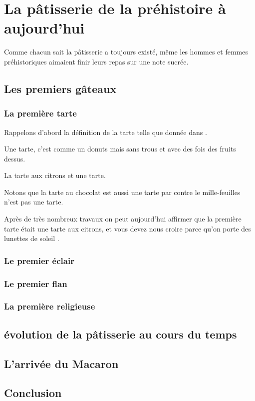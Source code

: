
\section{La pâtisserie de la préhistoire à aujourd'hui}

Comme chacun sait la pâtisserie a toujours existé, même les hommes et femmes préhistoriques aimaient finir leurs repas sur une note sucrée.

\subsection{Les premiers gâteaux}


\subsubsection{La première tarte}

Rappelons d'abord la définition de la tarte telle que donnée dans \cite{S2012}.

\begin{definition}[Tarte]
  Une tarte, c'est comme un donuts mais sans trous et avec des fois des fruits dessus.
\end{definition}

\begin{example}[Tarte]
  La tarte aux citrons et une tarte.
\end{example}

\begin{remark}
  Notons que la tarte au chocolat est aussi une tarte par contre le mille-feuilles n'est pas une tarte.
\end{remark}

Après de très nombreux travaux on peut aujourd'hui affirmer que la première tarte était une tarte aux citrons, et vous devez nous croire parce qu'on porte des lunettes de soleil \cite{C2012}.

\subsubsection{Le premier éclair}

\subsubsection{Le premier flan}

\subsubsection{La première religieuse}


\subsection{évolution de la pâtisserie au cours du temps}

\subsection{L'arrivée du Macaron}

\subsection{Conclusion}